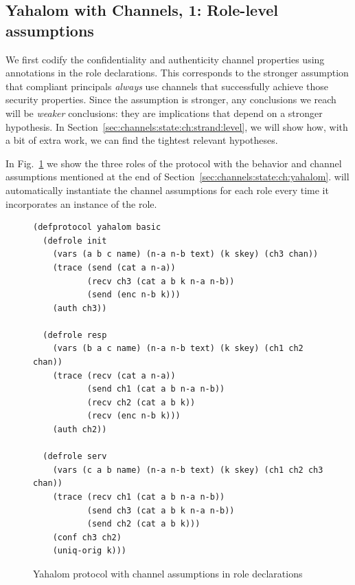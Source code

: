 \subsection{Yahalom with Channels, 1:  Role-level assumptions}
\label{sec:channels:state:ch:role:level}

We first codify the confidentiality and authenticity channel
properties using annotations in the role declarations.  This
corresponds to the stronger assumption that compliant principals
\emph{always} use channels that successfully achieve those security
properties.  Since the assumption is stronger, any conclusions we
reach will be \emph{weaker} conclusions: they are implications that
depend on a stronger hypothesis.  In
Section~\ref{sec:channels:state:ch:strand:level}, we will show how,
with a bit of extra work, we can find the tightest relevant
hypotheses.

In Fig.~\ref{fig:yahalom:ch:role} we show the three roles of the
protocol with the behavior and channel assumptions mentioned at the
end of Section~\ref{sec:channels:state:ch:yahalom}.  {\cpsa} will
automatically instantiate the channel assumptions for each role every
time it incorporates an instance of the role.
%
\begin{figure}\small
%
\begin{verbatim}(defprotocol yahalom basic
  (defrole init
    (vars (a b c name) (n-a n-b text) (k skey) (ch3 chan))
    (trace (send (cat a n-a))
           (recv ch3 (cat a b k n-a n-b))
           (send (enc n-b k)))
    (auth ch3))

  (defrole resp
    (vars (b a c name) (n-a n-b text) (k skey) (ch1 ch2 chan))
    (trace (recv (cat a n-a))
           (send ch1 (cat a b n-a n-b))
           (recv ch2 (cat a b k))
           (recv (enc n-b k)))
    (auth ch2))

  (defrole serv
    (vars (c a b name) (n-a n-b text) (k skey) (ch1 ch2 ch3 chan))
    (trace (recv ch1 (cat a b n-a n-b))
           (send ch3 (cat a b k n-a n-b))
           (send ch2 (cat a b k)))
    (conf ch3 ch2)
    (uniq-orig k)))\end{verbatim}
  \caption[Yahalom (role decls.)]{Yahalom protocol with channel
    assumptions in role declarations}
  \label{fig:yahalom:ch:role}
\end{figure}

